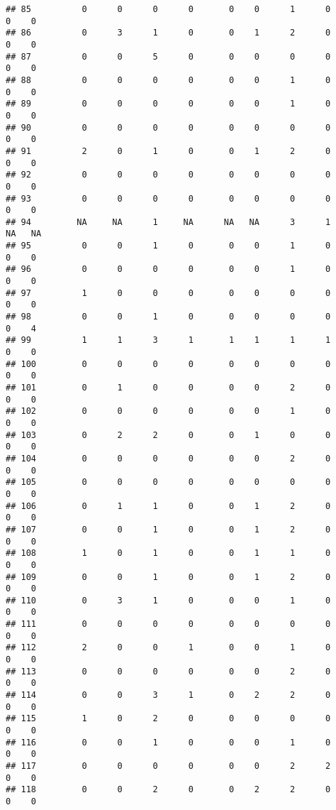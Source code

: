 \documentclass[
]{article}
\begin{document}
\begin{verbatim}
## 85          0      0      0      0       0    0      1      0       0    0
## 86          0      3      1      0       0    1      2      0       0    0
## 87          0      0      5      0       0    0      0      0       0    0
## 88          0      0      0      0       0    0      1      0       0    0
## 89          0      0      0      0       0    0      1      0       0    0
## 90          0      0      0      0       0    0      0      0       0    0
## 91          2      0      1      0       0    1      2      0       0    0
## 92          0      0      0      0       0    0      0      0       0    0
## 93          0      0      0      0       0    0      0      0       0    0
## 94         NA     NA      1     NA      NA   NA      3      1      NA   NA
## 95          0      0      1      0       0    0      1      0       0    0
## 96          0      0      0      0       0    0      1      0       0    0
## 97          1      0      0      0       0    0      0      0       0    0
## 98          0      0      1      0       0    0      0      0       0    4
## 99          1      1      3      1       1    1      1      1       0    0
## 100         0      0      0      0       0    0      0      0       0    0
## 101         0      1      0      0       0    0      2      0       0    0
## 102         0      0      0      0       0    0      1      0       0    0
## 103         0      2      2      0       0    1      0      0       0    0
## 104         0      0      0      0       0    0      2      0       0    0
## 105         0      0      0      0       0    0      0      0       0    0
## 106         0      1      1      0       0    1      2      0       0    0
## 107         0      0      1      0       0    1      2      0       0    0
## 108         1      0      1      0       0    1      1      0       0    0
## 109         0      0      1      0       0    1      2      0       0    0
## 110         0      3      1      0       0    0      1      0       0    0
## 111         0      0      0      0       0    0      0      0       0    0
## 112         2      0      0      1       0    0      1      0       0    0
## 113         0      0      0      0       0    0      2      0       0    0
## 114         0      0      3      1       0    2      2      0       0    0
## 115         1      0      2      0       0    0      0      0       0    0
## 116         0      0      1      0       0    0      1      0       0    0
## 117         0      0      0      0       0    0      2      2       0    0
## 118         0      0      2      0       0    2      2      0       0    0

\end{verbatim}
\end{document}
